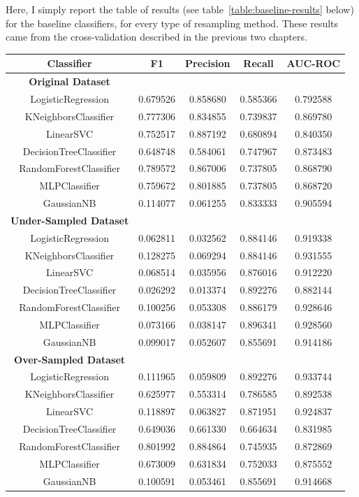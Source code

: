 \documentclass[12pt,a4paper,twoside]{report}
\begin{document}
Here, I simply report the table of results (see table~\ref{table:baseline-results} below) for the baseline classifiers, for every type of resampling method. These results came from the cross-validation described in the previous two chapters.

\begin{table}[H]  
  \centering
  \begin{tabular}{ccccc}
    \toprule
     Classifier & F1 & Precision & Recall & AUC-ROC \\ \midrule
     \textbf{Original Dataset} \\ \midrule
    LogisticRegression & 0.679526 &  0.858680 & 0.585366 & 0.792588 \\
    KNeighborsClassifier & 0.777306 &  0.834855 & 0.739837 & 0.869780\\
    LinearSVC  & 0.752517 &  0.887192  & 0.680894 & 0.840350 \\
    DecisionTreeClassifier & 0.648748 & 0.584061 & 0.747967 & 0.873483 \\
    RandomForestClassifier & 0.789572 &  0.867006  & 0.737805 & 0.868790\\
    MLPClassifier & 0.759672  & 0.801885 & 0.737805 & 0.868720 \\
    GaussianNB & 0.114077  & 0.061255 & 0.833333 & 0.905594 \\ \midrule
    \textbf{Under-Sampled Dataset} \\  \midrule
    
    LogisticRegression & 0.062811 &  0.032562 & 0.884146 & 0.919338 \\
    KNeighborsClassifier & 0.128275  & 0.069294 & 0.884146 & 0.931555\\
    LinearSVC  & 0.068514 &  0.035956 &  0.876016  & 0.912220 \\
    DecisionTreeClassifier & 0.026292 &  0.013374 & 0.892276 & 0.882144 \\
    RandomForestClassifier & 0.100256 &  0.053308 & 0.886179  & 0.928646\\
    MLPClassifier & 0.073166  & 0.038147 &  0.896341 & 0.928560 \\
    GaussianNB & 0.099017 &  0.052607 & 0.855691 & 0.914186 \\ \midrule
    
    \textbf{Over-Sampled Dataset} \\  \midrule
    
    LogisticRegression & 0.111965 &  0.059809 & 0.892276 & 0.933744 \\
    KNeighborsClassifier &0.625977  & 0.553314 & 0.786585 & 0.892538\\
    LinearSVC  & 0.118897  & 0.063827 & 0.871951  & 0.924837 \\
    DecisionTreeClassifier & 0.649036  & 0.661330 & 0.664634 & 0.831985 \\
    RandomForestClassifier &  0.801992 &  0.884864 & 0.745935  & 0.872869\\
    MLPClassifier & 0.673009  & 0.631834 & 0.752033 & 0.875552 \\
    GaussianNB & 0.100591  & 0.053461 & 0.855691 & 0.914668 \\ \midrule
    

\end{tabular}
\end{table}
\end{document}
